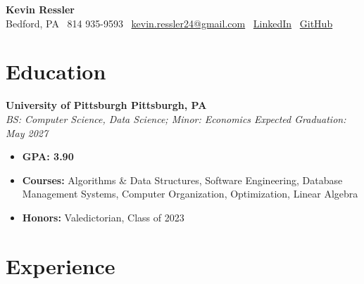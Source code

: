 \documentclass[11pt]{article}
\begin{document}
\begin{center}
  {\Huge \textbf{Kevin Ressler}}\\ [2pt]
  Bedford, PA \textbar\ 814 935-9593 \textbar\ \href{mailto:kevin.ressler24@gmail.com}{kevin.ressler24@gmail.com} \textbar\ \href{https://www.linkedin.com/in/kevin-ressler-09604929b}{LinkedIn} \textbar\ \href{https://github.com/kevinressler}{GitHub}
\end{center}

\section*{Education}
\vspace{0.1em}
\begin{adjustwidth}{0.5em}{0em}
\textbf{University of Pittsburgh \hfill Pittsburgh, PA} \\
\textit{BS: Computer Science, Data Science; Minor: Economics \hfill Expected Graduation: May 2027}
\begin{itemize}[leftmargin=1.5em, itemsep=0em, topsep=0.2em]
    \item \textbf{GPA: 3.90} 
    \item \textbf{Courses:} Algorithms \& Data Structures, Software Engineering, Database Management Systems, Computer Organization, Optimization, Linear Algebra
    \item \textbf{Honors:} Valedictorian, Class of 2023
\end{itemize}
\end{adjustwidth}






\section*{Experience}
\vspace{0.1em}
\end{document}
